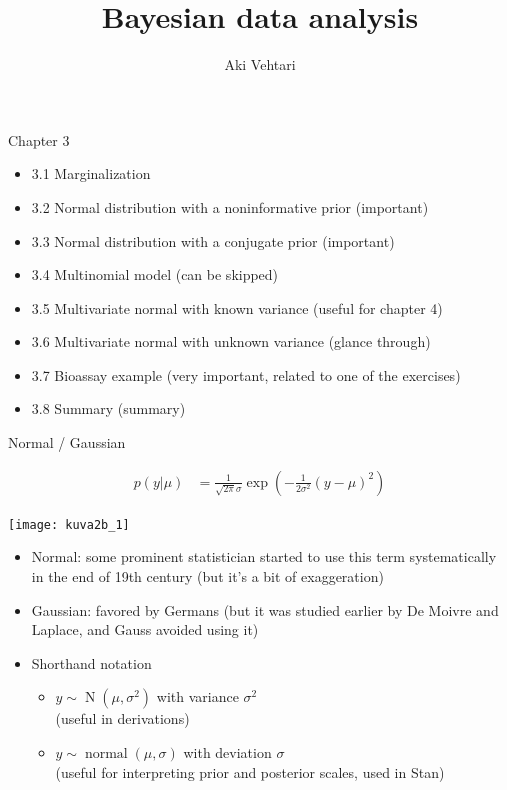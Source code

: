 \documentclass[finnish,english,t]{beamer}
\title[]{Bayesian data analysis}
\subtitle{}
\author{Aki Vehtari}
\institute[Aalto]{}
\DeclareMathOperator{\N}{N}
\DeclareMathOperator{\normal}{normal}
\begin{document}
\begin{frame}{Chapter 3}

  \begin{itemize}
\item 3.1 Marginalization
\item 3.2 Normal distribution with a noninformative prior (important)
\item 3.3 Normal distribution with a conjugate prior (important)
\item 3.4 Multinomial model (can be skipped)
\item 3.5 Multivariate normal with known variance (useful for chapter 4)
\item 3.6 Multivariate normal with unknown variance (glance through)
\item 3.7 Bioassay example (very important, related to one of the exercises)
\item 3.8 Summary (summary)
  \end{itemize}
\end{frame}

\begin{frame}{Normal / Gaussian}

    \vspace{-2\baselineskip}
    \begin{align*}
    p({y}|\mu)&=\frac{1}{\sqrt{2\pi}\sigma}\exp\left(-\frac{1}{2\sigma^2}({y}-\mu)^2\right)
    \end{align*}
    \vspace{-\baselineskip}
  \begin{center}
      \texttt{[image: kuva2b\_1]}
  \end{center}
    \vspace{-\baselineskip}
  \begin{itemize}
  \item<2-> Normal: {\color{gray} some prominent statistician started
      to use this term systematically in the end of 19th century (but
      it's a bit of exaggeration)}
  \item<3-> Gaussian: {\color{gray}favored by Germans (but it was
      studied earlier by De Moivre and Laplace, and Gauss avoided
      using it)}
  \item<4-> Shorthand notation\\
    \begin{itemize}
    \item ${y} \sim \N(\mu,\sigma^2)$ with variance $\sigma^2$\\
      (useful in derivations)
    \item ${y} \sim \normal(\mu,\sigma)$ with deviation $\sigma$\\
      (useful for interpreting prior and posterior scales, used in
      Stan)
    \end{itemize}
  \end{itemize}
  
\end{frame}
\end{document}
